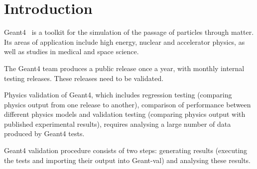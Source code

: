 \section{Introduction}
\label{sec-introduction}
Geant4~\cite{Geant4} is a toolkit for the simulation of the passage of particles through matter. Its areas of application include high energy, nuclear and accelerator physics, as well as studies in medical and space science. 

The Geant4 team produces a public release once a year, with monthly internal testing releases. These releases need to be validated.

Physics validation of Geant4, which includes regression testing (comparing physics output from one release to another), comparison of performance between different physics models and validation testing (comparing physics output with published experimental results), requires analysing a large number of data produced by Geant4 tests. %



Geant4 validation procedure consists of two steps: generating results (executing the tests and importing their output into Geant-val) and analysing these results.